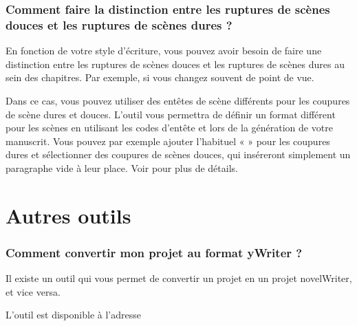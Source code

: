 \documentclass[a4paper,11pt,french]{sphinxmanual}
\begin{document}
\subsubsection*{Comment faire la distinction entre les ruptures de scènes douces et les ruptures de scènes dures ?}

\sphinxAtStartPar
En fonction de votre style d’écriture, vous pouvez avoir besoin de faire une distinction entre les ruptures de scènes douces et les ruptures de scènes dures au sein des chapitres. Par exemple, si vous changez souvent de point de vue.

\sphinxAtStartPar
Dans ce cas, vous pouvez utiliser des en\sphinxhyphen{}têtes de scène différents pour les coupures de scène dures et douces. L’outil  vous permettra de définir un format différent pour les scènes en utilisant les codes d’en\sphinxhyphen{}tête \sphinxcode{\sphinxupquote{\#\#\#}} et \sphinxcode{\sphinxupquote{\#\#\#!}} lors de la génération de votre manuscrit. Vous pouvez par exemple ajouter l’habituel « \sphinxcode{\sphinxupquote{* * *}} » pour les coupures dures et sélectionner des coupures de scènes douces, qui inséreront simplement un paragraphe vide à leur place. Voir {\hyperref[\detokenize{project_manuscript:a-manuscript-settings}]{}} pour plus de détails.

\sphinxAtStartPar
{}


\section{Autres outils}
\label{\detokenize{int_howto:other-tools}}\subsubsection*{Comment convertir mon projet au format yWriter ?}

\sphinxAtStartPar
Il existe un outil qui vous permet de convertir un projet  en un projet novelWriter, et vice versa.

\sphinxAtStartPar
L’outil est disponible à l’adresse 

\sphinxstepscope
\end{document}
